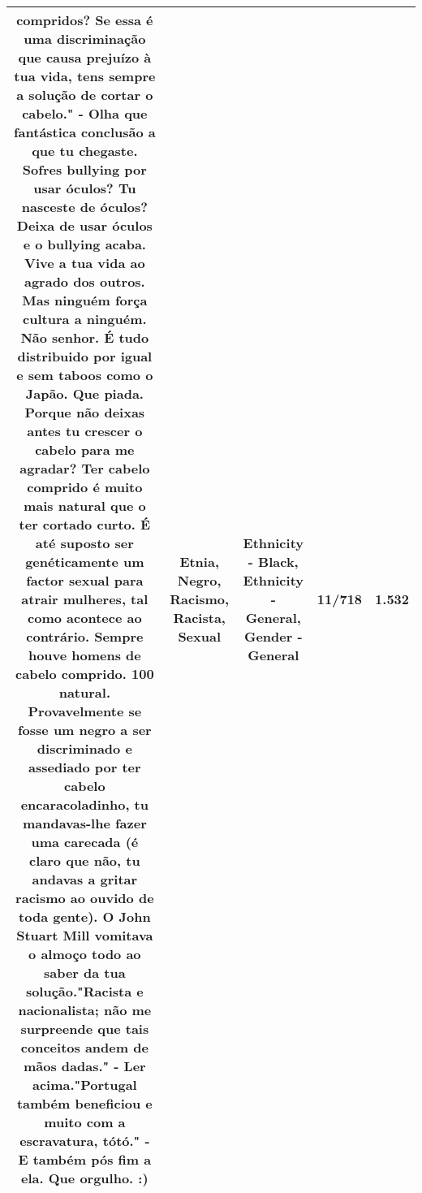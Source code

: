 \documentclass[11pt]{article}
\newlength\mylength
\begin{document}
\begin{center}
\begin{longtable}{|C{.65\mylength}|C{.30\mylength}|C{.12\mylength}|C{.12\mylength}|C{.12\mylength}|}
compridos? Se essa é uma discriminação que causa prejuízo à tua vida, tens sempre a solução de cortar o cabelo." - Olha que fantástica conclusão a que tu chegaste. Sofres bullying por usar óculos? Tu nasceste de óculos? Deixa de usar óculos e o bullying acaba. Vive a tua vida ao agrado dos outros. Mas ninguém força cultura a ninguém. Não senhor. É tudo distribuido por igual e sem taboos como o Japão. Que piada. Porque não deixas antes tu crescer o cabelo para me agradar? Ter cabelo comprido é muito mais natural que o ter cortado curto. É até suposto ser genéticamente um factor \textbf{sexual} para atrair mulheres, tal como acontece ao contrário. Sempre houve homens de cabelo comprido. 100 natural. Provavelmente se fosse um \textbf{negro} a ser discriminado e assediado por ter cabelo encaracoladinho, tu mandavas-lhe fazer uma carecada (é claro que não, tu andavas a gritar \textbf{racismo} ao ouvido de toda gente). O John Stuart Mill vomitava o almoço todo ao saber da tua solução."\textbf{Racista} e nacionalista; não me surpreende que tais conceitos andem de mãos dadas." - Ler acima."Portugal também beneficiou e muito com a escravatura, tótó." - E também pós fim a ela. Que orgulho. :)\normalsize   & Etnia, Negro, Racismo, Racista, Sexual & Ethnicity - Black, Ethnicity - General, Gender - General & 11/718 & 1.532 \\  \hline

\end{longtable}
\end{center}
\end{document}
